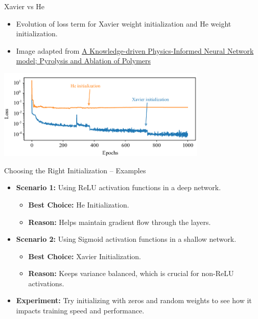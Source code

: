 \documentclass[serif, aspectratio=169]{beamer}
\begin{document}
\begin{frame}{Xavier vs He}
\begin{itemize}
\item Evolution of loss term for Xavier weight initialization and He weight initialization.
\item Image adapted from \href{https://www.researchgate.net/publication/363843256_A_Knowledge-driven_Physics-Informed_Neural_Network_model_Pyrolysis_and_Ablation_of_Polymers}{A Knowledge-driven Physics-Informed Neural Network model; Pyrolysis and Ablation of Polymers}
\end{itemize}
    \begin{center}
        \includegraphics[width=10cm]{pic/Evolution-of-loss-term-for-Xavier-weight-initialization-and-He-weight-initialization.png}  
    \end{center}
 
\end{frame}
\begin{frame}{Choosing the Right Initialization – Examples}

    \begin{itemize}
        \item \textbf{Scenario 1:} Using ReLU activation functions in a deep network.
        \begin{itemize}
            \item \textbf{Best Choice:} He Initialization.
            \item \textbf{Reason:} Helps maintain gradient flow through the layers.
        \end{itemize}
        
        \item \textbf{Scenario 2:} Using Sigmoid activation functions in a shallow network.
        \begin{itemize}
            \item \textbf{Best Choice:} Xavier Initialization.
            \item \textbf{Reason:} Keeps variance balanced, which is crucial for non-ReLU activations.
        \end{itemize}
        
        \item \textbf{Experiment:} Try initializing with zeros and random weights to see how it impacts training speed and performance.
    \end{itemize}
    
\end{frame}
\end{document}
